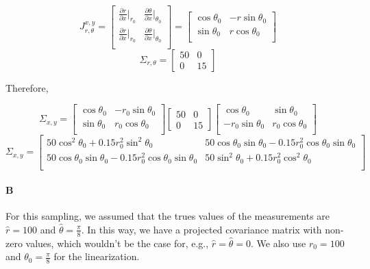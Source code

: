 \documentclass[12pt]{article}
\begin{document}
\[
J_{r,\theta}^{x,y} =
\left[ {\begin{array}{cc}
	\frac{\partial r}{\partial x}|_{r_0} & \frac{\partial \theta}{\partial x}|_{\theta_0}  \\[5pt]
	\frac{\partial r}{\partial x}|_{r_0} & \frac{\partial \theta}{\partial x}|_{\theta_0}  \\[5pt]
	 \end{array} } \right] =
\left[ {\begin{array}{cc}
	\cos\theta_0 & -r\sin\theta_0  \\
	\sin\theta_0 & r\cos\theta_0  \\
	 \end{array} } \right]
\]
\[
\Sigma_{r,\theta} =
\left[ {\begin{array}{cc}
	50 & 0  \\
	0 & 15 \end{array} }\right]
\]

Therefore,

\[
\Sigma_{x,y} = \left[ {\begin{array}{cc}
	\cos\theta_0 & -r_0\sin\theta_0  \\
	\sin\theta_0 & r_0\cos\theta_0  \\
	 \end{array} } \right]
	 	\left[ {\begin{array}{cc}
	50 & 0  \\
	0 & 15 \end{array} }\right]
	\left[ {\begin{array}{cc}
	\cos\theta_0 & \sin\theta_0  \\
	-r_0\sin\theta_0 & r_0\cos\theta_0  \\
	 \end{array} } \right] \]
\[
\Sigma_{x,y} = \left[ {\begin{array}{cc}
		50\cos^2\theta_0 + 0.15r_0^2\sin^2\theta_0 & 50\cos\theta_0\sin\theta_0 - 0.15r_0^2\cos\theta_0\sin\theta_0  \\[5pt]
	50\cos\theta_0\sin\theta_0 - 0.15r_0^2\cos\theta_0\sin\theta_0 & 50\sin^2\theta_0 + 0.15r_0^2\cos^2\theta_0 \\[5pt]
	 \end{array} } \right] 
\]

\paragraph{B} For this sampling, we assumed that the trues values of the measurements are $\hat{r}=100$ and $\hat{\theta}=\frac{\pi}{8}$. In this way, we have a projected covariance matrix with non-zero values, which wouldn't be the case for, e.g., $\hat{r}=\hat{\theta}=0$. We also use $r_0=100$ and $\theta_0=\frac{\pi}{8}$ for the linearization.
\end{document}
